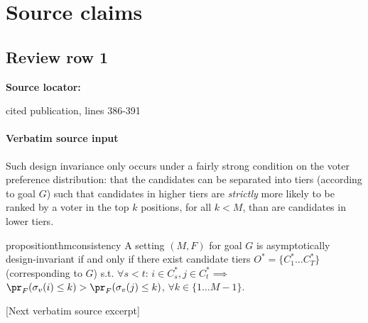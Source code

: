 \documentclass[10pt]{article}
\begin{document}
\clearpage
\hypertarget{source-claim-80ef2800a9578ca5}{}
\hypertarget{source-section-f10b5f68e4acf3dc}{}
\section*{Source claims}
\subsection*{Review row 1}
\textbf{Source locator:} {\footnotesize\raggedright cited publication, lines 386-\allowbreak{}391\par}
\paragraph{Verbatim source input}
\begin{ReviewVerbatim}
Such design invariance only occurs under a fairly strong condition on the voter preference distribution: that the candidates can be separated into tiers (according to goal $G$) such that candidates in higher tiers are \textit{strictly} more likely to be ranked by a voter in the top $k$ positions, for all $k<M$, than are candidates in lower tiers.

\begin{restatable}{proposition}{thmconsistency}
	\label{thm:consistency}
	A setting $(M, F)$ for goal $G$ is asymptotically design-invariant if and only if there exist candidate tiers $O^* = \{C_1^*\dots C_T^*\}$ (corresponding to $G$) s.t. $\forall s<t$: $i \in C^*_s, j\in C^*_t \implies$ $\pr_F(\sigma_v(i) \leq k) > \pr_F(\sigma_v(j) \leq k)$, $\forall k\in\{1 \dots M-1 \}$.
\end{restatable}

[Next verbatim source excerpt]


\end{ReviewVerbatim}
\end{document}
